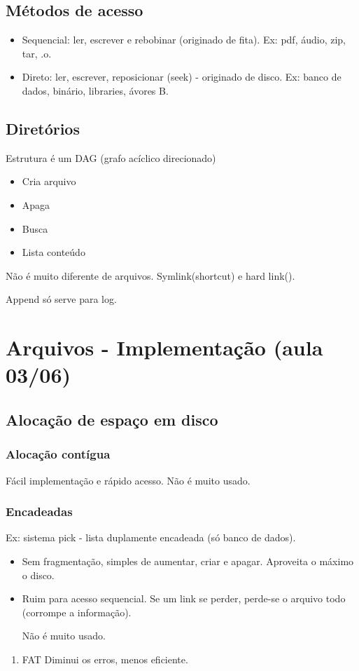 \documentclass[11pt]{article}
\begin{document}
\subsection{Métodos de acesso}
\label{sec:org025284f}
\begin{itemize}
\item Sequencial: ler, escrever e rebobinar (originado de fita). Ex: pdf, áudio, zip, tar,
.o.
\item Direto: ler, escrever, reposicionar (seek) - originado de disco. Ex: banco de dados,
binário, libraries, ávores B.
\end{itemize}
\subsection{Diretórios}
\label{sec:orgfaf4081}
Estrutura é um DAG (grafo acíclico direcionado)
\begin{itemize}
\item Cria arquivo
\item Apaga
\item Busca
\item Lista conteúdo
\end{itemize}

Não é muito diferente de arquivos. Symlink(shortcut) e hard link().

Append só serve para log.
\section{Arquivos - Implementação (aula 03/06)}
\label{sec:org6deddee}
\subsection{Alocação de espaço em disco}
\label{sec:orgbc43606}
\subsubsection{Alocação contígua}
\label{sec:org53eccab}
Fácil implementação e rápido acesso. Não é muito usado.
\subsubsection{Encadeadas}
\label{sec:org7d7b71e}
Ex: sistema pick - lista duplamente encadeada (só banco de dados).
\begin{itemize}
\item Sem fragmentação, simples de aumentar, criar e apagar. Aproveita o máximo o disco.
\item Ruim para acesso sequencial. Se um link se perder, perde-se o arquivo todo (corrompe
a informação).

Não é muito usado.
\end{itemize}
\begin{enumerate}
\item FAT
\label{sec:org73ef5fe}
Diminui os erros, menos eficiente.
\end{enumerate}
\end{document}
